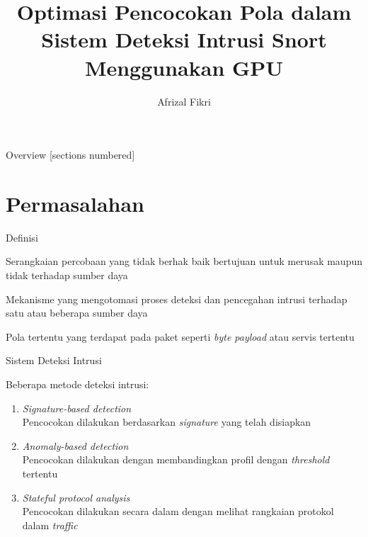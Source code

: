\documentclass[10pt,xcolor=table]{beamer}
\title{Optimasi Pencocokan Pola dalam Sistem Deteksi Intrusi Snort Menggunakan GPU}
\date{}
\author{Afrizal Fikri}
\institute{13513004}
\begin{document}
\maketitle

\begin{frame}{Overview}
    [sections numbered]
    \tableofcontents[hideallsubsections]
\end{frame}

\section{Permasalahan}

\begin{frame}[fragile]{Definisi}
    \begin{Ldescription}

        \item[Intrusi] Serangkaian percobaan yang tidak berhak baik bertujuan untuk merusak maupun tidak terhadap sumber daya

        \item[Sistem deteksi intrusi] Mekanisme yang mengotomasi proses deteksi dan pencegahan intrusi terhadap satu atau beberapa sumber daya

        \item[\emph{Signature}] Pola tertentu yang terdapat pada paket seperti \emph{byte payload} atau servis tertentu

    \end{Ldescription}
\end{frame}

\begin{frame}[fragile]{Sistem Deteksi Intrusi}

    Beberapa metode deteksi intrusi:
    \begin{enumerate}
        
        \item \emph{Signature-based detection} \\
        Pencocokan dilakukan berdasarkan \emph{signature} yang telah disiapkan
        
        \item \emph{Anomaly-based detection} \\
        Pencocokan dilakukan dengan membandingkan profil dengan \emph{threshold} tertentu
        
        \item \emph{Stateful protocol analysis} \\
        Pencocokan dilakukan secara dalam dengan melihat rangkaian protokol dalam \emph{traffic}
    
    \end{enumerate}    
\end{frame}
\end{document}
